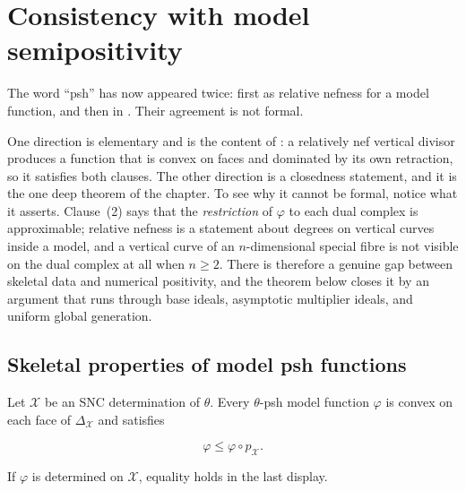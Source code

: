 \section{Consistency with model semipositivity}
\label{sec:ch21-consistency}

The word ``psh'' has now appeared twice: first as relative nefness for a
model function, and then in .  Their agreement is not
formal.

One direction is elementary and is the content of
: a relatively nef vertical divisor
produces a function that is convex on faces and dominated by its own
retraction, so it satisfies both clauses.  The other direction is a
closedness statement, and it is the one deep theorem of the chapter.  To see
why it cannot be formal, notice what it asserts.  Clause~(2) says that the
\emph{restriction} of $\varphi$ to each dual complex is approximable;
relative nefness is a statement about degrees on vertical curves inside a
model, and a vertical curve of an $n$-dimensional special fibre is not
visible on the dual complex at all when $n\geq2$.  There is therefore a
genuine gap between skeletal data and numerical positivity, and the theorem
below closes it by an argument that runs through base ideals, asymptotic
multiplier ideals, and uniform global generation.

\subsection{Skeletal properties of model psh functions}
\label{sec:ch21-model-skeletal}

\begin{lemma}\label{lem:ch21-model-skeletal-properties}
Let $\mathcal X$ be an SNC determination of $\theta$.  Every
$\theta$-psh model function $\varphi$ is convex on each face of
$\Delta_{\mathcal X}$ and satisfies

\[
                 \varphi\leq\varphi\circ p_{\mathcal X}.
\]

If $\varphi$ is determined on $\mathcal X$, equality holds in the last
display.
\end{lemma}

